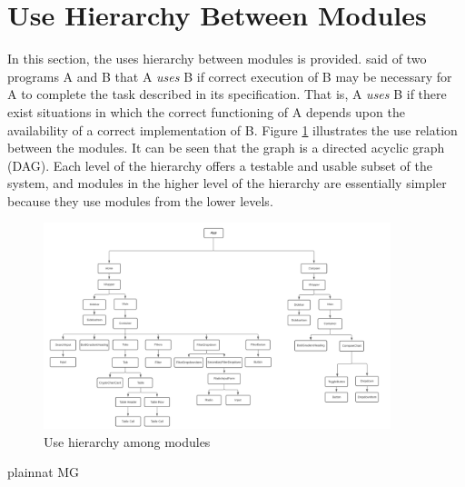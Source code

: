 \documentclass[12pt, titlepage]{article}
\begin{document}
\section{Use Hierarchy Between Modules} \label{SecUse}

In this section, the uses hierarchy between modules is
provided. \citet{Parnas1978} said of two programs A and B that A {\em uses} B if
correct execution of B may be necessary for A to complete the task described in
its specification. That is, A {\em uses} B if there exist situations in which
the correct functioning of A depends upon the availability of a correct
implementation of B.  Figure \ref{FigUH} illustrates the use relation between
the modules. It can be seen that the graph is a directed acyclic graph
(DAG). Each level of the hierarchy offers a testable and usable subset of the
system, and modules in the higher level of the hierarchy are essentially simpler
because they use modules from the lower levels.

\begin{figure}[H]
\centering
\includegraphics[width=0.9\textwidth]{./images/usehier.png}
\caption{Use hierarchy among modules}
\label{FigUH}
\end{figure}


 {plainnat}
 {MG}
\end{document}
